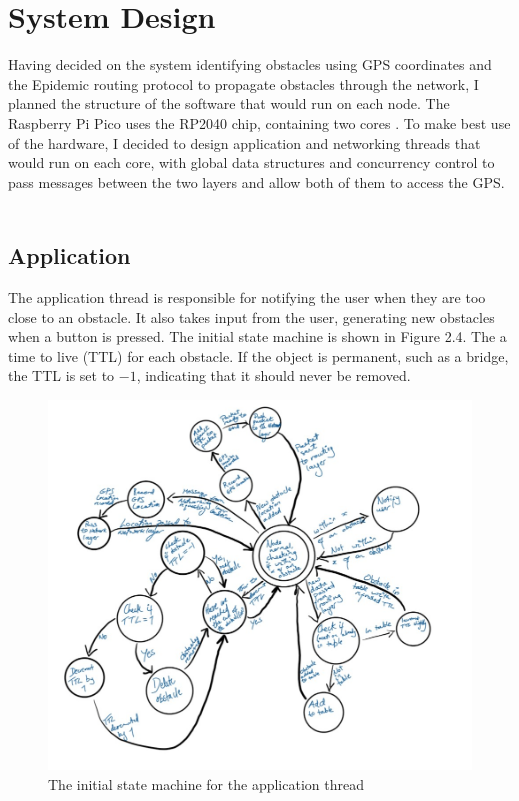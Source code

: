 \documentclass[12pt,a4paper]{report}
\begin{document}
\section{System Design}
Having decided on the system identifying obstacles using GPS coordinates and the Epidemic routing protocol to propagate obstacles through the network, I planned the structure of the software that would run on each node. The Raspberry Pi Pico uses the RP2040 chip, containing two cores \cite{rp2040}. To make best use of the hardware, I decided to design application and networking threads that would run on each core, with global data structures and concurrency control to pass messages between the two layers and allow both of them to access the GPS. \\ \\

\subsection{Application}
The application thread is responsible for notifying the user when they are too close to an obstacle. It also takes input from the user, generating new obstacles when a button is pressed. The initial state machine is shown in Figure 2.4. The a time to live (TTL) for each obstacle. If the object is permanent, such as a bridge, the TTL is set to $-1$, indicating that it should never be removed. 
\begin{figure}[h]
\begin{center}
\includegraphics[scale=0.5]{appThread.jpg}
\caption{The initial state machine for the application thread}
\end{center}
\end{figure}
\FloatBarrier
\end{document}
